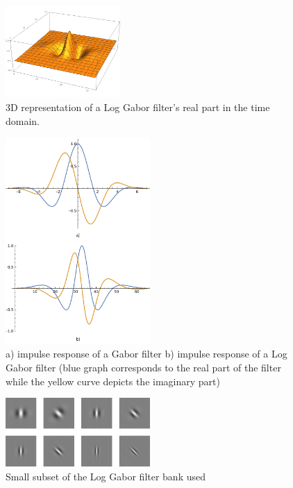 \documentclass[journal]{IEEEtran}
\begin{document}
\begin{figure}[H]
\centering
  \includegraphics[width=0.39\textwidth]{iris/log_gabor_2d.png}
	\caption{3D representation of a Log Gabor filter's real part in the time domain.}
	\label{fig:2Dloggabor}
\end{figure}
\begin{figure}[t]
\centering
  \includegraphics[width=0.49\textwidth]{iris/impulse_response}
	\caption{a) impulse response of a Gabor filter b) impulse response of a Log Gabor filter (blue graph corresponds to the real part of the filter while the yellow curve depicts the imaginary part)}
	\label{fig:impulse_response}
\end{figure}

\begin{figure}[t]
	\centering
  \includegraphics[width=0.49\textwidth]{iris/2d_log_gabor_filter.png}
	\caption{Small subset of the Log Gabor filter bank used}
	\label{fig:filter_bank}
\end{figure}
\end{document}
